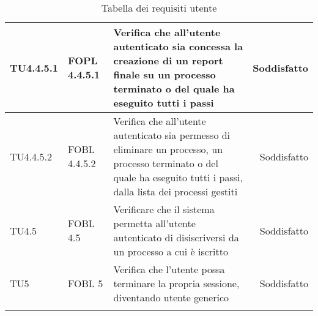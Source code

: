 \begin{longtable}{llXr}
\midrule
TU4.4.5.1&FOPL 4.4.5.1&Verifica che all'utente autenticato sia concessa la creazione di un report finale su un processo terminato o del quale ha eseguito tutti i passi&Soddisfatto\\
\midrule
TU4.4.5.2&FOBL 4.4.5.2&Verifica che all'utente autenticato sia permesso di eliminare un processo, un processo terminato o del quale ha eseguito tutti i passi, dalla lista dei processi gestiti&Soddisfatto\\
\midrule
TU4.5&FOBL 4.5&Verificare che il sistema permetta all'utente autenticato di disiscriversi da un processo a cui è iscritto&Soddisfatto\\
\midrule
TU5&FOBL 5&Verifica che l'utente possa terminare la propria sessione, diventando utente generico&Soddisfatto\\
\bottomrule
\caption{Tabella dei requisiti utente}
\end{longtable}